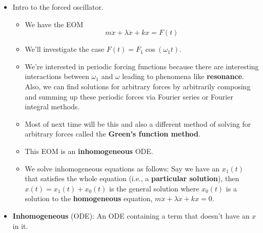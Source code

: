\documentclass[../notes.tex]{subfiles}
\begin{document}
\begin{itemize}
    \item Intro to the forced oscillator.
    \begin{itemize}
        \item We have the EOM
        \begin{equation*}
            m\ddot{x}+\lambda\dot{x}+kx = F(t)
        \end{equation*}
        \item We'll investigate the case $F(t)=F_1\cos(\omega_1t)$.
        \item We're interested in periodic forcing functions because there are interesting interactions between $\omega_1$ and $\omega$ leading to phenomena like \textbf{resonance}. Also, we can find solutions for arbitrary forces by arbitrarily composing and summing up these periodic forces via Fourier series or Fourier integral methods.
        \item Most of next time will be this and also a different method of solving for arbitrary forces called the \textbf{Green's function method}.
        \item This EOM is an \textbf{inhomogeneous} ODE.
        \item We solve inhomogeneous equations as follows: Say we have an $x_1(t)$ that satisfies the whole equation (i.e., a \textbf{particular solution}), then $x(t)=x_1(t)+x_0(t)$ is the general solution where $x_0(t)$ is a solution to the \textbf{homogeneous} equation, $m\ddot{x}+\lambda\dot{x}+kx=0$.
    \end{itemize}
    \item \textbf{Inhomogeneous} (ODE): An ODE containing a term that doesn't have an $x$ in it.
\end{itemize}
\end{document}
